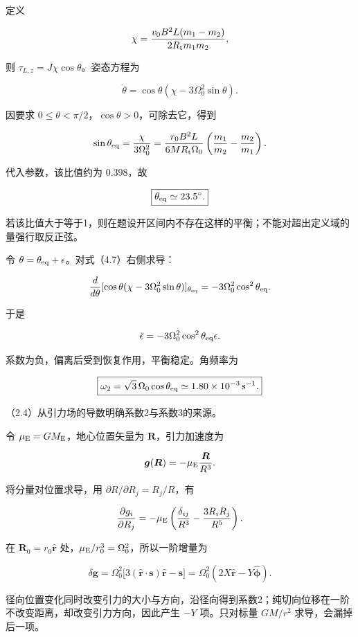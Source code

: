 \documentclass[12pt,a4paper,fontset=fandol]{ctexart}
\begin{document}
定义

\[
\chi=\frac{v_0B^2L(m_1-m_2)}{2R_{\rm t}m_1m_2},
\]

则 \(\tau_{L,z}=J\chi\cos\theta\)。姿态方程为

\[
\ddot\theta=\cos\theta(\chi-3\Omega_0^2\sin\theta).
\tag{4.7}
\]

因要求 \(0\le\theta<\pi/2\)，\(\cos\theta>0\)，可除去它，得到

\[
\sin\theta_{\rm eq}=\frac{\chi}{3\Omega_0^2}
=\frac{r_0B^2L}{6MR_{\rm t}\Omega_0}
\left(\frac{m_1}{m_2}-\frac{m_2}{m_1}\right).
\]

代入参数，该比值约为 \(0.398\)，故

\[
\boxed{\theta_{\rm eq}\simeq23.5^\circ.}
\]

若该比值大于等于1，则在题设开区间内不存在这样的平衡；不能对超出定义域的量强行取反正弦。

令 \(\theta=\theta_{\rm eq}+\epsilon\)。对式（4.7）右侧求导：

\[
\frac{d}{d\theta}
[\cos\theta(\chi-3\Omega_0^2\sin\theta)]_{\theta_{\rm eq}}
=-3\Omega_0^2\cos^2\theta_{\rm eq}.
\]

于是

\[
\ddot\epsilon=-3\Omega_0^2\cos^2\theta_{\rm eq}\epsilon.
\]

系数为负，偏离后受到恢复作用，平衡稳定。角频率为

\[
\boxed{\omega_2=\sqrt3\,\Omega_0\cos\theta_{\rm eq}
\simeq1.80\times10^{-3}\,\mathrm{s^{-1}}.}
\]

（2.4）从引力场的导数明确系数2与系数3的来源。

令 \(\mu_{\rm E}=GM_{\rm E}\)，地心位置矢量为
\(\boldsymbol R\)，引力加速度为

\[
\boldsymbol g(\boldsymbol R)=-\mu_{\rm E}\frac{\boldsymbol R}{R^3}.
\]

将分量对位置求导，用 \(\partial R/\partial R_j=R_j/R\)，有

\[
\frac{\partial g_i}{\partial R_j}
=-\mu_{\rm E}\left(\frac{\delta_{ij}}{R^3}
-\frac{3R_iR_j}{R^5}\right).
\]

在 \(\boldsymbol R_0=r_0\hat{\boldsymbol r}\)
处，\(\mu_{\rm E}/r_0^3=\Omega_0^2\)，所以一阶增量为

\[
\delta\boldsymbol g
=\Omega_0^2\big[3(\hat{\boldsymbol r}\cdot\boldsymbol s)
\hat{\boldsymbol r}-\boldsymbol s\big]
=\Omega_0^2(2X\hat{\boldsymbol r}-Y\hat{\boldsymbol\phi}).
\]

径向位置变化同时改变引力的大小与方向，沿径向得到系数2；纯切向位移在一阶不改变距离，却改变引力方向，因此产生
\(-Y\) 项。只对标量 \(GM/r^2\) 求导，会漏掉后一项。
\end{document}
